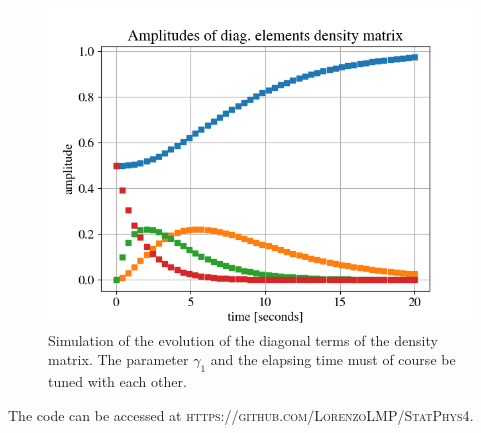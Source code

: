 \documentclass[11pt,letterpaper]{article}
\begin{document}
\begin{figure}
\centering
\includegraphics[width=1.0\linewidth]{./lind_lore}
\caption{Simulation of the evolution of the diagonal terms of the density matrix. The parameter $\gamma_1$ and the elapsing time must of course be tuned with each other.}
\label{fig:lind_lore}
\end{figure}

The code can be accessed at \textsc{https://github.com/LorenzoLMP/StatPhys4}.
\end{document}
